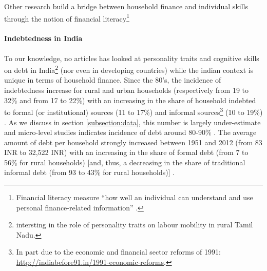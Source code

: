 \documentclass[a4paper, 11pt, onecolumn]{article}
\begin{document}
Other research build a bridge between household finance and individual skills through the notion of financial literacy\footnote{Financial literacy measure ``how well an individual can understand and use personal finance-related information'' \citep{Huston2010}.} \citep{Hastings2013} \citep{Gaurav2012} \citep{Klapper2012}

\paragraph*{Indebtedness in India}
To our knowledge, no articles has looked at personality traits and cognitive skills on debt in India\footnote{\cite{Michiels2021} intersting in the role of personality traits on labour mobility in rural Tamil Nadu.} (nor even in developing countries) while the indian context is unique in terms of household finance.
Since the 80's, the incidence of indebtedness increase for rural and urban households (respectively from 19 to 32\% and from 17 to 22\%) with an increasing in the share of household indebted to formal (or institutional) sources (11 to 17\%) and informal sources\footnote{In part due to the economic and financial sector reforms of 1991: \url{http://indiabefore91.in/1991-economic-reforms}.} (10 to 19\%) \citep{Rajakumar2019}.
As we discuss in section \ref{subsection:data}, this number is largely under-estimate \citep{Jones1994} and micro-level studies indicates incidence of debt around 80-90\% \citep{Guerin2013a, Jones1994, Dreze1997, Reboul2021}.
The average amount of debt per household strongly increased between 1951 and 2012 (from 83 INR to 32,522 INR) with an increasing in the share of formal debt (from 7 to 56\% for rural households) [and, thus, a decreasing in the share of traditional informal debt (from 93 to 43\% for rural households)] \citep{Rajakumar2019}.


\end{document}
